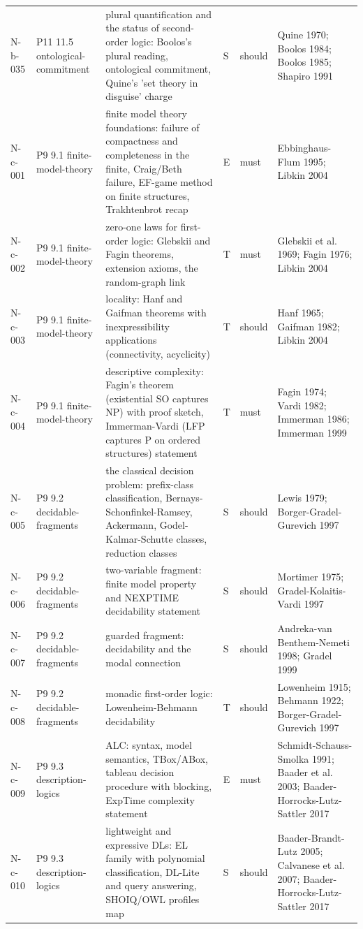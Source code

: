 \begin{longtable}{@{}p{0.52in}p{0.85in}p{2.5in}p{0.22in}p{0.42in}p{1.95in}@{}}
N-b-035 & P11 11.5 ontological-commitment & plural quantification and the status of second-order logic: Boolos's plural reading, ontological commitment, Quine's 'set theory in disguise' charge & S & should & Quine 1970; Boolos 1984; Boolos 1985; Shapiro 1991 \\
N-c-001 & P9 9.1 finite-model-theory & finite model theory foundations: failure of compactness and completeness in the finite, Craig/Beth failure, EF-game method on finite structures, Trakhtenbrot recap & E & must & Ebbinghaus-Flum 1995; Libkin 2004 \\
N-c-002 & P9 9.1 finite-model-theory & zero-one laws for first-order logic: Glebskii and Fagin theorems, extension axioms, the random-graph link & T & must & Glebskii et al. 1969; Fagin 1976; Libkin 2004 \\
N-c-003 & P9 9.1 finite-model-theory & locality: Hanf and Gaifman theorems with inexpressibility applications (connectivity, acyclicity) & T & should & Hanf 1965; Gaifman 1982; Libkin 2004 \\
N-c-004 & P9 9.1 finite-model-theory & descriptive complexity: Fagin's theorem (existential SO captures NP) with proof sketch, Immerman-Vardi (LFP captures P on ordered structures) statement & T & must & Fagin 1974; Vardi 1982; Immerman 1986; Immerman 1999 \\
N-c-005 & P9 9.2 decidable-fragments & the classical decision problem: prefix-class classification, Bernays-Schonfinkel-Ramsey, Ackermann, Godel-Kalmar-Schutte classes, reduction classes & S & should & Lewis 1979; Borger-Gradel-Gurevich 1997 \\
N-c-006 & P9 9.2 decidable-fragments & two-variable fragment: finite model property and NEXPTIME decidability statement & S & should & Mortimer 1975; Gradel-Kolaitis-Vardi 1997 \\
N-c-007 & P9 9.2 decidable-fragments & guarded fragment: decidability and the modal connection & S & should & Andreka-van Benthem-Nemeti 1998; Gradel 1999 \\
N-c-008 & P9 9.2 decidable-fragments & monadic first-order logic: Lowenheim-Behmann decidability & T & should & Lowenheim 1915; Behmann 1922; Borger-Gradel-Gurevich 1997 \\
N-c-009 & P9 9.3 description-logics & ALC: syntax, model semantics, TBox/ABox, tableau decision procedure with blocking, ExpTime complexity statement & E & must & Schmidt-Schauss-Smolka 1991; Baader et al. 2003; Baader-Horrocks-Lutz-Sattler 2017 \\
N-c-010 & P9 9.3 description-logics & lightweight and expressive DLs: EL family with polynomial classification, DL-Lite and query answering, SHOIQ/OWL profiles map & S & should & Baader-Brandt-Lutz 2005; Calvanese et al. 2007; Baader-Horrocks-Lutz-Sattler 2017 \\

\end{longtable}
